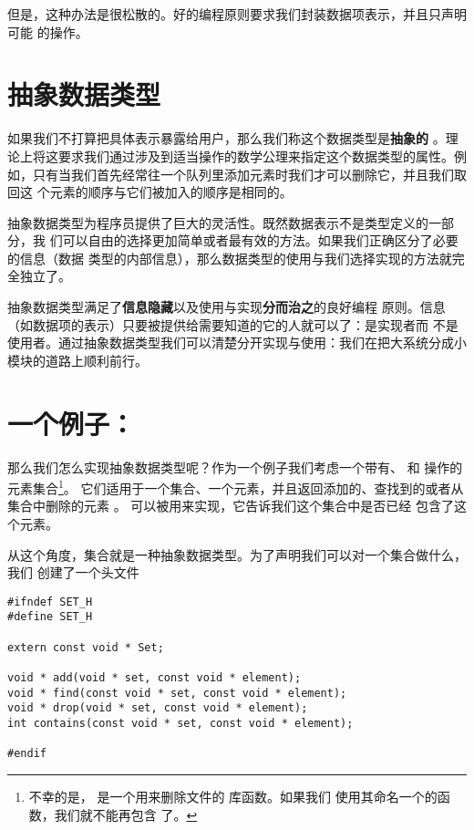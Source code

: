 但是，这种办法是很松散的。好的编程原则要求我们封装数据项表示，并且只声明可能
的操作。

\section{抽象数据类型}

如果我们不打算把具体表示暴露给用户，那么我们称这个数据类型是\textbf{抽象的}
。理论上将这要求我们通过涉及到适当操作的数学公理来指定这个数据类型的属性。例
如，只有当我们首先经常往一个队列里添加元素时我们才可以删除它，并且我们取回这
个元素的顺序与它们被加入的顺序是相同的。

抽象数据类型为程序员提供了巨大的灵活性。既然数据表示不是类型定义的一部分，我
们可以自由的选择更加简单或者最有效的方法。如果我们正确区分了必要的信息（数据
类型的内部信息），那么数据类型的使用与我们选择实现的方法就完全独立了。

抽象数据类型满足了\textbf{信息隐藏}以及使用与实现\textbf{分而治之}的良好编程
原则。信息（如数据项的表示）只要被提供给需要知道的它的人就可以了：是实现者而
不是使用者。通过抽象数据类型我们可以清楚分开实现与使用：我们在把大系统分成小
模块的道路上顺利前行。

\section{一个例子：}
那么我们怎么实现抽象数据类型呢？作为一个例子我们考虑一个带有、
 和 操作的元素集合\footnote{
不幸的是， 是一个用来删除文件的 库函数。如果我们
使用其命名一个的函数，我们就不能再包含 了。}。
它们适用于一个集合、一个元素，并且返回添加的、查找到的或者从集合中删除的元素
。 可以被用来实现，它告诉我们这个集合中是否已经
包含了这个元素。

从这个角度，集合就是一种抽象数据类型。为了声明我们可以对一个集合做什么，我们
创建了一个头文件
\begin{lstlisting}
#ifndef SET_H
#define SET_H

extern const void * Set;

void * add(void * set, const void * element);
void * find(const void * set, const void * element);
void * drop(void * set, const void * element);
int contains(const void * set, const void * element);

#endif
\end{lstlisting}

